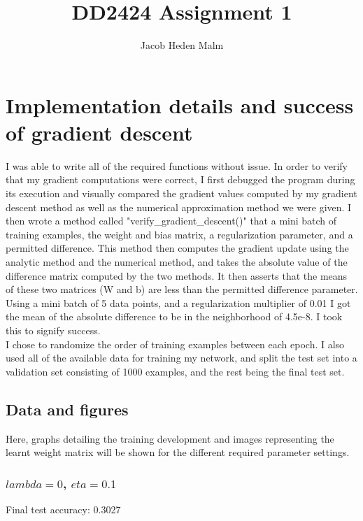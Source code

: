 \documentclass[11pt,a4paper]{article}
\author{Jacob Heden Malm}
\title{DD2424 Assignment 1}
\begin{document}
\maketitle

\section{Implementation details and success of gradient descent}

I was able to write all of the required functions without issue. In order to verify that my gradient computations were correct, I first debugged the program during its execution and visually compared the gradient values computed by my gradient descent method as well as the numerical approximation method we were given. I then wrote a method called "verify\_gradient\_descent()" that a mini batch of training examples, the weight and bias matrix, a regularization parameter, and a permitted difference. This method then computes the gradient update using the analytic method and the numerical method, and takes the absolute value of the difference matrix computed by the two methods. It then asserts that the means of these two matrices (W and b) are less than the permitted difference parameter. Using a mini batch of 5 data points, and a regularization multiplier of 0.01 I got the mean of the absolute difference to be in the neighborhood of 4.5e-8. I took this to signify success.\\

I chose to randomize the order of training examples between each epoch. I also used all of the available data for training my network, and split the test set into a validation set consisting of 1000 examples, and the rest being the final test set.

\subsection{Data and figures}
Here, graphs detailing the training development and images representing the learnt weight matrix will be shown for the different required parameter settings.

\subsubsection{$lambda=0$, $eta=0.1$}
Final test accuracy: 0.3027
\end{document}
